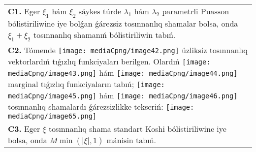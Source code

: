 \documentclass{article}
\begin{document}
\begin{tabular}{m{17cm}}
\textbf{C1.} Eger \(\xi_{1}\) hám \(\xi_{2}\) sáykes túrde \(\lambda_{1}\) hám \(\lambda_{2}\) parametrli Puasson bólistiriliwine iye bolǵan ǵárezsiz tosınnanlıq shamalar bolsa, onda \(\xi_{1} + \xi_{2}\) tosınnanlıq shamanıń bólistiriliwin tabıń.
 \\
\textbf{C2.} Tómende \texttt{[image: mediaCpng/image42.png]} úzliksiz tosınnanlıq vektorlardıń tıǵızlıq funkciyaları berilgen. Olardıń \texttt{[image: mediaCpng/image43.png]} hám \texttt{[image: mediaCpng/image44.png]} marginal tıǵızlıq funkciyaların tabıń; \texttt{[image: mediaCpng/image45.png]} hám \texttt{[image: mediaCpng/image46.png]} tosınnanlıq shamalardı ǵárezsizlikke tekseriń: \texttt{[image: mediaCpng/image65.png]}
 \\
\textbf{C3.} Eger \(\xi\) tosınnanlıq shama standart Koshi bólistiriliwine iye bolsa, onda \(M\min\left( |\xi|,1 \right)\) mánisin tabıń.
 \\

\end{tabular}
\vspace{1cm}
\end{document}
